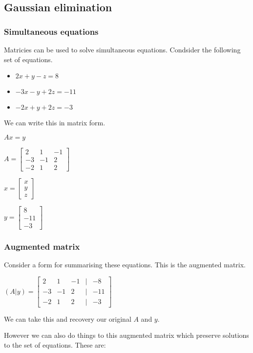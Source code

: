 
\subsection{Gaussian elimination}

\subsubsection{Simultaneous equations}

Matricies can be used to solve simultaneous equations. Condsider the following set of equations.

\begin{itemize}
\item \(2x+y-z=8\)
\item \(-3x-y+2z=-11\)
\item \(-2x+y+2z=-3\)
\end{itemize}

We can write this in matrix form.

\(Ax=y\)

\(A=\begin{bmatrix}2 & 1&-1\\-3 & -1&2\\-2&1&2\end{bmatrix}\)

\(x=\begin{bmatrix}x \\y \\z\end{bmatrix}\)

\(y=\begin{bmatrix}8 \\-11 \\-3\end{bmatrix}\)

\subsubsection{Augmented matrix}

Consider a form for summarising these equations. This is the augmented matrix.

\((A|y)=\begin{bmatrix}2 & 1&-1&|&-8\\-3 & -1&2&|&-11\\-2&1&2&|&-3\end{bmatrix}\)

We can take this and recovery our original \(A\) and \(y\).

However we can also do things to this augmented matrix which preserve solutions to the set of equations. These are:

